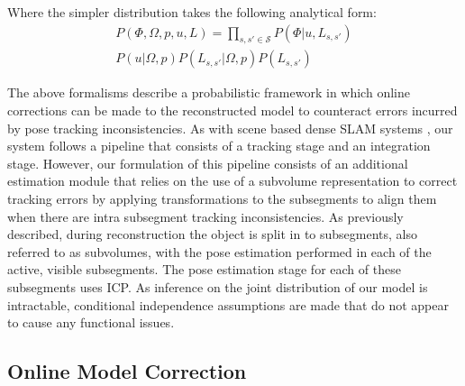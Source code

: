 Where the simpler distribution takes the following analytical form:
\begin{equation}
\begin{split}
P(\Phi, \Omega, p, u, L) = 
\prod_{s, s' \in \mathcal{S}} P(\Phi|u, L_{s, s'}) \\
P(u|\Omega, p)
P(L_{s, s'}|\Omega, p)
P(L_{s, s'})
\end{split}
\end{equation}

The above formalisms describe a probabilistic framework in which online corrections can be made to the reconstructed model to counteract 
errors incurred by pose tracking inconsistencies. As with scene based dense SLAM systems \cite{Newcombe2011, Prisacariu2014, Niessner2013}, 
our system follows a pipeline that consists of a tracking stage and an integration stage. However, our formulation of this pipeline 
consists of an additional estimation module that relies on the use of a subvolume representation to correct tracking errors by applying 
transformations to the subsegments to align them when there are intra subsegment tracking inconsistencies. 
As previously described, during reconstruction the object is split in to subsegments, also referred to as subvolumes, 
with the pose estimation performed in each of the active, visible subsegments. The pose estimation stage for each of these subsegments uses ICP.
As inference on the joint distribution of our model is intractable, conditional independence assumptions are made that do not appear 
to cause any functional issues.

\subsection{Online Model Correction}
\label{subsec:onlinemodelcorrection}

